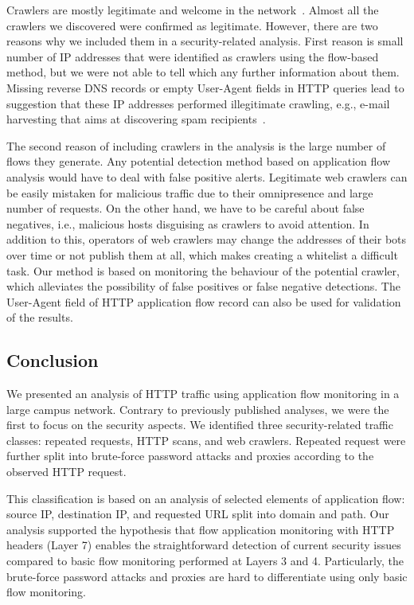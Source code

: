 Crawlers are mostly legitimate and welcome in the network~\cite{Sun-2010-Ethicality}. Almost all the crawlers we discovered were confirmed as legitimate. However, there are two reasons why we included them in a security-related analysis. First reason is small number of IP addresses that were identified as crawlers using the flow-based method, but we were not able to tell which any further information about them. Missing reverse DNS records or empty User-Agent fields in HTTP queries lead to suggestion that these IP addresses performed illegitimate crawling, e.g., e-mail harvesting that aims at discovering spam recipients~\cite{Hohlfeld-2012-Longtime}.

The second reason of including crawlers in the analysis is the large number of flows they generate. Any potential detection method based on application flow analysis would have to deal with false positive alerts. Legitimate web crawlers can be easily mistaken for malicious traffic due to their omnipresence and large number of requests. On the other hand, we have to be careful about false negatives, i.e., malicious hosts disguising as crawlers to avoid attention. In addition to this, operators of web crawlers may change the addresses of their bots over time or not publish them at all, which makes creating a whitelist a difficult task. Our method is based on monitoring the behaviour of the potential crawler, which alleviates the possibility of false positives or false negative detections. The User-Agent field of HTTP application flow record can also be used for validation of the results.


\subsection{Conclusion}\label{subsec:httpsecurity-conclusion}

We presented an analysis of HTTP traffic using application flow monitoring in a large campus network. Contrary to previously published analyses, we were the first to focus on the security aspects.
We identified three security-related traffic classes: repeated requests, HTTP scans, and web crawlers. Repeated request were further split into brute-force password attacks and proxies according to the observed HTTP request.

This classification is based on an analysis of selected elements of application flow: source IP, destination IP, and requested URL split into domain and path.
Our analysis supported the hypothesis that flow application monitoring with HTTP headers (Layer 7) enables the straightforward detection of current security issues compared to basic flow monitoring performed at Layers 3 and 4. Particularly, the brute-force password attacks and proxies are hard to differentiate using only basic flow monitoring.

